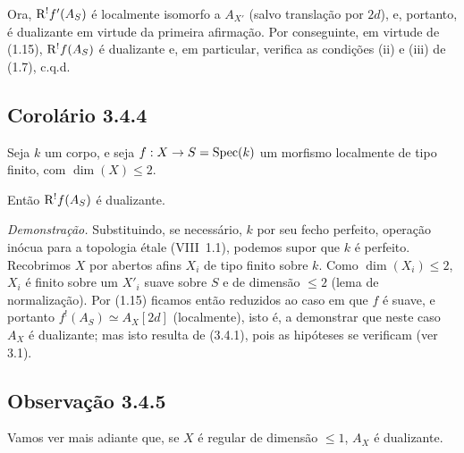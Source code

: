 Ora, $\mathrm{R}^{!}f'(A_S)$ é localmente isomorfo a $A_{X'}$ (salvo translação por $2d$), e, portanto, é dualizante em virtude da primeira afirmação. Por conseguinte, em virtude de (1.15), $\mathrm{R}^{!}f(A_S)$ é dualizante e, em particular, verifica as condições (ii) e (iii) de (1.7), c.q.d.

\subsection*{Corolário 3.4.4}
Seja $k$ um corpo, e seja $f : X \to S = \operatorname{Spec}(k)$ um morfismo localmente de tipo finito, com $\dim(X) \leqslant 2$.

Então $\mathrm{R}^{!}f(A_S)$ é dualizante.

\emph{Demonstração.} Substituindo, se necessário, $k$ por seu fecho perfeito, operação inócua para a topologia étale (VIII~1.1), podemos supor que $k$ é perfeito. Recobrimos $X$ por abertos afins $X_i$ de tipo finito sobre $k$. Como $\dim(X_i) \leqslant 2$, $X_i$ é finito sobre um $X'_i$ suave sobre $S$ e de dimensão $\leqslant 2$ (lema de normalização). Por (1.15) ficamos então reduzidos ao caso em que $f$ é suave, e portanto $f^{!}(A_S) \simeq A_X[2d]$ (localmente), isto é, a demonstrar que neste caso $A_X$ é dualizante; mas isto resulta de (3.4.1), pois as hipóteses se verificam (ver 3.1).

\subsection*{Observação 3.4.5}
Vamos ver mais adiante que, se $X$ é regular de dimensão $\leqslant 1$, $A_X$ é dualizante.
